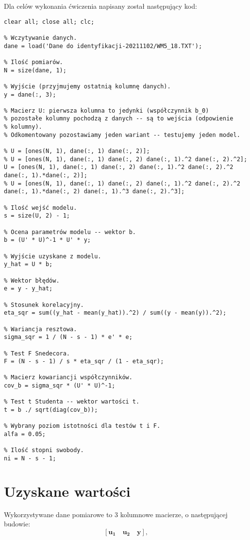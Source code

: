 \documentclass[11pt, a4paper]{article}
\begin{document}
Dla celów wykonania ćwiczenia napisany został następujący kod:
\begin{lstlisting}
clear all; close all; clc;

% Wczytywanie danych.
dane = load('Dane do identyfikacji-20211102/WM5_18.TXT');

% Ilość pomiarów.
N = size(dane, 1);

% Wyjście (przyjmujemy ostatnią kolumnę danych).
y = dane(:, 3);

% Macierz U: pierwsza kolumna to jedynki (współczynnik b_0)
% pozostałe kolumny pochodzą z danych -- są to wejścia (odpowienie
% kolumny).
% Odkomentowany pozostawiamy jeden wariant -- testujemy jeden model.

% U = [ones(N, 1), dane(:, 1) dane(:, 2)];
% U = [ones(N, 1), dane(:, 1) dane(:, 2) dane(:, 1).^2 dane(:, 2).^2];
U = [ones(N, 1), dane(:, 1) dane(:, 2) dane(:, 1).^2 dane(:, 2).^2 dane(:, 1).*dane(:, 2)];
% U = [ones(N, 1), dane(:, 1) dane(:, 2) dane(:, 1).^2 dane(:, 2).^2 dane(:, 1).*dane(:, 2) dane(:, 1).^3 dane(:, 2).^3];

% Ilość wejść modelu.
s = size(U, 2) - 1;

% Ocena parametrów modelu -- wektor b.
b = (U' * U)^-1 * U' * y;

% Wyjście uzyskane z modelu.
y_hat = U * b;

% Wektor błędów.
e = y - y_hat;

% Stosunek korelacyjny.
eta_sqr = sum((y_hat - mean(y_hat)).^2) / sum((y - mean(y)).^2);

% Wariancja resztowa.
sigma_sqr = 1 / (N - s - 1) * e' * e;

% Test F Snedecora.
F = (N - s - 1) / s * eta_sqr / (1 - eta_sqr);

% Macierz kowariancji współczynników.
cov_b = sigma_sqr * (U' * U)^-1;

% Test t Studenta -- wektor wartości t.
t = b ./ sqrt(diag(cov_b));

% Wybrany poziom istotności dla testów t i F.
alfa = 0.05;

% Ilość stopni swobody.
ni = N - s - 1;
\end{lstlisting}


\section{Uzyskane wartości}

Wykorzystywane dane pomiarowe to 3 kolumnowe macierze, o następującej budowie:
\begin{equation*}
	\left[ \mathbf{u_1} \quad \mathbf{u_2} \quad \mathbf{y} \right],
\end{equation*}
\end{document}
